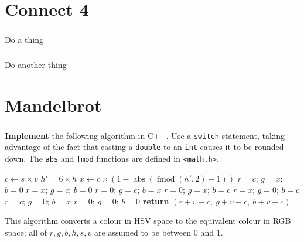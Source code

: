 \documentclass{scrartcl}
\begin{document}


\clearpage
\part{Connect 4}

\section{}
Do a thing

\section{}
Do another thing

\clearpage
\part{Mandelbrot}

\section{}

\textbf{Implement} the following algorithm in C++. Use a \lstinline{switch} statement,
taking advantage of the fact that casting a \lstinline{double} to an \lstinline{int} causes it to be rounded down.
The \lstinline{abs} and \lstinline{fmod} functions are defined in \lstinline{<math.h>}.

\begin{algorithm}
\begin{algorithmic}
		\State $c \gets s \times v$
		\State $h' = 6 \times h$
		\State $x \gets c \times \left(1 - \operatorname{abs} \left( \operatorname{fmod} \left( h', 2 \right) - 1 \right) \right)$
		     \State $r = c$; $g = x$; $b = 0$
		  \State $r = x$; $g = c$; $b = 0$
		  \State $r = 0$; $g = c$; $b = x$
		  \State $r = 0$; $g = x$; $b = c$
		  \State $r = x$; $g = 0$; $b = c$
		  \State $r = c$; $g = 0$; $b = x$
		\Else                    \State $r = 0$; $g = 0$; $b = 0$
		\EndIf
		\State \textbf{return} $(r+v-c,\ g+v-c,\ b+v-c)$
	\EndProcedure
\end{algorithmic}
\end{algorithm}

This algorithm converts a colour in HSV space to the equivalent colour in RGB space;
all of $r,g,b,h,s,v$ are assumed to be between $0$ and $1$.
\end{document}
